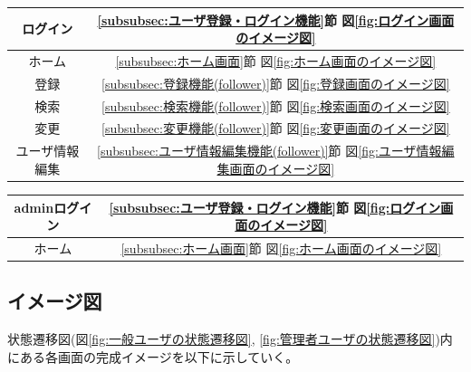 \documentclass[11ptm]{jsarticle}
\begin{document}
\begin{minipage}[t]{0.5\linewidth}
  \vspace{1zh}
  \begin{center}
    \begin{tabular}{c|c}
      ログイン       & \ref{subsubsec:ユーザ登録・ログイン機能}節 図\ref{fig:ログイン画面のイメージ図}           \\
      \hline
      ホーム         & \ref{subsubsec:ホーム画面}節 図\ref{fig:ホーム画面のイメージ図}                           \\
      \hline
      登録           & \ref{subsubsec:登録機能(follower)}節 図\ref{fig:登録画面のイメージ図}                     \\
      \hline
      検索           & \ref{subsubsec:検索機能(follower)}節 図\ref{fig:検索画面のイメージ図}                     \\
      \hline
      変更           & \ref{subsubsec:変更機能(follower)}節 図\ref{fig:変更画面のイメージ図}                     \\
      \hline
      ユーザ情報編集 & \ref{subsubsec:ユーザ情報編集機能(follower)}節 図\ref{fig:ユーザ情報編集画面のイメージ図} \\
    \end{tabular}
  \end{center}
\end{minipage}
%
\hfill
%
\begin{minipage}[t]{0.5\linewidth}
  \vspace{1zh}
  \begin{center}
    \begin{tabular}{c|c}
      adminログイン & \ref{subsubsec:ユーザ登録・ログイン機能}節 図\ref{fig:ログイン画面のイメージ図} \\
      \hline
      ホーム        & \ref{subsubsec:ホーム画面}節 図\ref{fig:ホーム画面のイメージ図}                 \\
    \end{tabular}
  \end{center}
\end{minipage}

\clearpage
\subsection{イメージ図}
\label{sec:イメージ図}
状態遷移図(図\ref{fig:一般ユーザの状態遷移図}, \ref{fig:管理者ユーザの状態遷移図})内にある各画面の完成イメージを以下に示していく。

\end{document}
